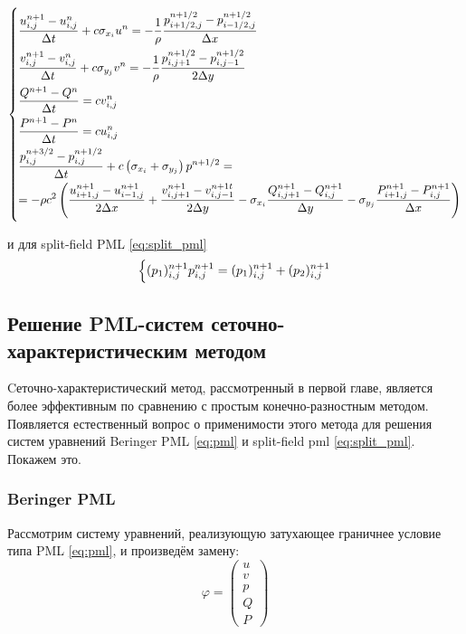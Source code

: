 \begin{equation}
	\begin{dcases}
		\frac{u^{n+1}_{i,j} - u^{n}_{i,j}}{\Delta t} + c \sigma_{x_{i}} u^{n} = -\frac{1}{\rho}\frac{p^{n+1/2}_{i+1/2,j} - p^{n+1/2}_{i-1/2,j}}{\Delta x} \\
		\frac{v^{n+1}_{i,j} - v^{n}_{i,j}}{\Delta t} + c \sigma_{y_{j}} v^{n}  = -\frac{1}{\rho}\frac{p^{n+1/2}_{i,j+1} - p^{n+1/2}_{i,j-1}}{2\Delta y} \\
		\frac{Q^{n+1} - Q^{n}}{\Delta t} = c v^n_{i,j}\\
		\frac{P^{n+1} - P^{n}}{\Delta t} = c u^n_{i,j}\\
	    \dfrac{p^{n+3/2}_{i,j} - p^{n+1/2}_{i,j}}{\Delta t} + c \left(\sigma_{x_{i}} + \sigma_{y_{j}}\right)p^{n+1/2} =\\= -\rho c^2 \left(\frac{u^{n+1}_{i+1,j} - u^{n+1}_{i-1,j}}{2\Delta x} + \dfrac{v^{n+1}_{i,j+1} - v^{n+1t}_{i,j-1}}{2\Delta y} - \sigma_{x_i}\frac{Q^{n+1}_{i,j+1} - Q^{n+1}_{i,j}}{\Delta y} - \sigma_{y_j}\frac{P^{n+1}_{i+1,j} - P^{n+1}_{i,j}}{\Delta x} \right)
	\end{dcases}\label{eq:diff_pml}
\end{equation}
    
и для split-field PML \ref{eq:split_pml}
\begin{equation}
    \begin{dcases}
        (p_1)_{i,j}^{n+1}
        p_{i,j}^{n+1} = (p_1)_{i,j}^{n+1} + (p_2)_{i,j}^{n+1}
    \end{dcases}
    \label{eq:diff_split_pml}
\end{equation}
    
\subsection{Решение PML-систем сеточно-характеристическим методом}
    
Cеточно-характеристический метод, рассмотренный в первой главе, является более эффективным по сравнению с простым конечно-разностным методом. Появляется естественный вопрос о применимости этого метода для решения систем уравнений Beringer PML \eqref{eq:pml} и split-field pml \eqref{eq:split_pml}. Покажем это.
    
\subsubsection{Beringer PML}
    
Рассмотрим систему уравнений, реализующую затухающее граничнее условие типа PML \eqref{eq:pml}, и произведём замену:
\begin{equation}
    \varphi = \begin{pmatrix}
        u \\ v \\ p \\ Q \\ P
    \end{pmatrix}
\end{equation}
    
